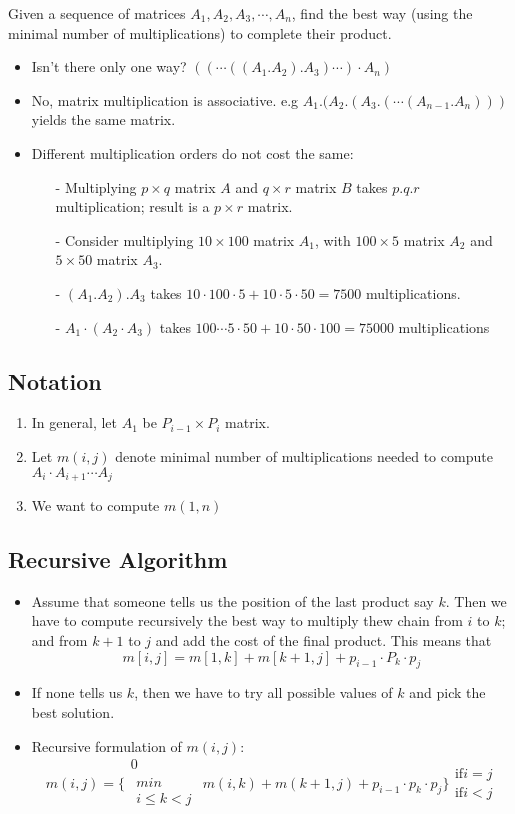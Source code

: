 \documentclass[12pt]{report}
\begin{document}
	Given a sequence of matrices $A_1, A_2, A_3, \cdots , A_n$, find the best way (using the minimal number of multiplications) to complete their product.
	\begin{itemize}
		\item Isn't there only one way? $((\cdots ((A_1 . A_2). A_3)\cdots)\cdot A_n)$
		\item No, matrix multiplication is associative. e.g $A_1 . (A_2. (A_3. (\cdots (A_{n-1} . A_n )))$ yields the same matrix.
		\item Different multiplication orders do not cost the same:
		\begin{enumerate}
			\item[-] Multiplying $p \times q$ matrix $A$ and $q \times r$ matrix $B$ takes $p.q.r$ multiplication; result is a $p\times r$ matrix.
			\item[-] Consider multiplying $10 \times 100$ matrix $A_1$, with $100 \times 5$ matrix $A_2$ and $5 \times 50$ matrix $A_3$.
			\item[-] $(A_1 . A_2) . A_3$ takes $10\cdot 100 \cdot 5 + 10\cdot 5 \cdot 50 = 7500$ multiplications.
			\item[-] $A_1\cdot (A_2 \cdot A_3)$ takes $100 \cdots 5 \cdot 50 + 10 \cdot 50 \cdot 100 = 75000$ multiplications
		\end{enumerate}
	\end{itemize}
	\subsection{Notation}
	\begin{enumerate}
		\item In general, let $A_1$ be $P_{i-1} \times P_i$ matrix.
		\item Let $m(i,j)$ denote minimal number of multiplications needed to compute $A_i \cdot A_{i+1} \cdots A_j$
		\item We want to compute $m(1,n)$
	\end{enumerate}
	\subsection{Recursive Algorithm}
	\begin{itemize}
		\item Assume that someone tells us the position of the last product say $k$. Then we have to compute recursively the best way to multiply thew chain from $i$ to $k$; and from $k+1$ to $j$ and add the cost of the final product. This means that 
		$$m[i,j] = m[1,k] + m[k+1,j] + p_{i-1} \cdot P_k\cdot p_j$$
		\item If none tells us $k$, then we have to try all possible values of $k$ and pick the best solution.
		\item Recursive formulation of $m(i,j):$
		$$m(i,j) = \bigg\{\substack{0\\{\substack{min\\{i\le k < j}}}} m(i,k) + m(k+1,j) + p_{i-1} \cdot p_k \cdot p_j\bigg\}\substack{{\text{if}{i=j}}\\ {\text{if}{i<j}}}$$
	\end{itemize}
\end{document}
